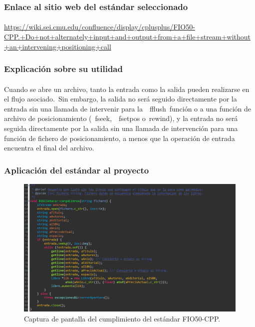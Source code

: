 		\subsubsection{Enlace al sitio web del estándar seleccionado}
		
			\paragraph{}\url{https://wiki.sei.cmu.edu/confluence/display/cplusplus/FIO50-CPP.+Do+not+alternately+input+and+output+from+a+file+stream+without+an+intervening+positioning+call}
		
		\subsubsection{Explicación sobre su utilidad}
		
			\paragraph{}Cuando se abre un archivo, tanto la entrada como la salida pueden realizarse en el flujo asociado. Sin embargo, la salida no será seguido directamente por la entrada sin una llamada de intervenir para la  fflush función o a una función de archivo de posicionamiento ( fseek,  fsetpos o rewind), y la entrada no será seguida directamente por la salida sin una llamada de intervención para una función de fichero de posicionamiento, a menos que la operación de entrada encuentra el final del archivo.
		
		\subsubsection{Aplicación del estándar al proyecto}
		
			\begin{figure}[H]
				\centering
				\includegraphics[scale=0.8]{img/img7.png}
				\caption{Captura de pantalla del cumplimiento del estándar FIO50-CPP.}
				\label{img7}
			\end{figure}
		
